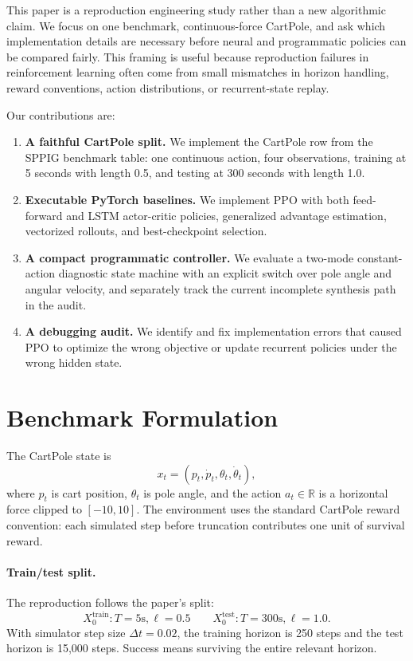 \documentclass[letterpaper,twocolumn,10pt]{article}
\newcommand{\dt}{\Delta t}
\newcommand{\train}{\mathrm{train}}
\newcommand{\test}{\mathrm{test}}
\begin{document}
This paper is a reproduction engineering study rather than a new algorithmic
claim.  We focus on one benchmark, continuous-force CartPole, and ask which
implementation details are necessary before neural and programmatic policies
can be compared fairly.  This framing is useful because reproduction failures
in reinforcement learning often come from small mismatches in horizon handling,
reward conventions, action distributions, or recurrent-state replay.

Our contributions are:
\begin{enumerate}
  \item \textbf{A faithful CartPole split.} We implement the CartPole row from
  the SPPIG benchmark table: one continuous action, four observations, training
  at 5 seconds with length 0.5, and testing at 300 seconds with length 1.0.
  \item \textbf{Executable PyTorch baselines.} We implement PPO with both
  feed-forward and LSTM actor-critic policies, generalized advantage
  estimation, vectorized rollouts, and best-checkpoint selection.
  \item \textbf{A compact programmatic controller.} We evaluate a two-mode
  constant-action diagnostic state machine with an explicit switch over pole
  angle and angular velocity, and separately track the current incomplete
  synthesis path in the audit.
  \item \textbf{A debugging audit.} We identify and fix implementation errors
  that caused PPO to optimize the wrong objective or update recurrent policies
  under the wrong hidden state.
\end{enumerate}

\section{Benchmark Formulation}
\label{sec:benchmark}

The CartPole state is
\[
    x_t = (p_t, \dot p_t, \theta_t, \dot\theta_t),
\]
where $p_t$ is cart position, $\theta_t$ is pole angle, and the action
$a_t \in \mathbb{R}$ is a horizontal force clipped to $[-10, 10]$.  The
environment uses the standard CartPole reward convention: each simulated step
before truncation contributes one unit of survival reward.

\paragraph{Train/test split.}
The reproduction follows the paper's split:
\[
X_0^\train: T=5\mathrm{s}, \ell=0.5
\quad\quad
X_0^\test: T=300\mathrm{s}, \ell=1.0.
\]
With simulator step size $\dt = 0.02$, the training horizon is 250 steps and
the test horizon is 15,000 steps.  Success means surviving the entire relevant
horizon.
\end{document}
